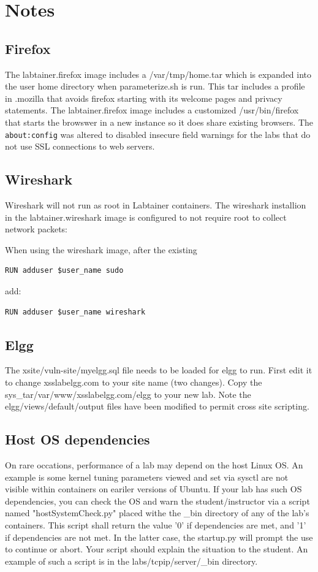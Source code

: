 \documentclass[12pt]{article}
\begin{document}
\section{Notes} \label{Notes}
\subsection{Firefox}
The labtainer.firefox image includes a /var/tmp/home.tar 
which is expanded into the user home directory when parameterize.sh is run.
This tar includes a profile in .mozilla that avoids firefox starting with its 
welcome pages and privacy statements.  The labtainer.firefox image includes a 
customized /usr/bin/firefox that starts the browswer in a new instance so it does share existing browsers. 
The {\tt about:config}
was altered to disabled insecure field warnings for the labs that do not use SSL connections to web servers.

\subsection{Wireshark}
Wireshark will not run as root in Labtainer containers.  
The wireshark installion in the labtainer.wireshark image is configured to not
require root to collect network packets:

When using the wireshark image, after the existing 
\begin{verbatim}
RUN adduser $user_name sudo
\end{verbatim}

\noindent add:

\begin{verbatim}
RUN adduser $user_name wireshark
\end{verbatim}

\subsection{Elgg}
The xsite/vuln-site/myelgg.sql file needs to be loaded for elgg to run.  First edit it to
change xsslabelgg.com to your site name (two changes).  Copy the sys\_tar/var/www/xsslabelgg.com/elgg
to your new lab.  Note the elgg/views/default/output files have been modified to permit cross site scripting.
\subsection{Host OS dependencies}
On rare occations, performance of a lab may depend on the host Linux OS.  An example is some
kernel tuning parameters viewed and set via sysctl are not visible within containers on eariler versions
of Ubuntu.  If your lab has such OS dependencies, you can check the OS and warn the student/instructor via a script
named "hostSystemCheck.py" placed withe the \_bin directory of any of the lab's containers.  This script shall
return the value '0' if dependencies are met, and '1' if dependencies are not met.  In the latter case, the 
startup.py will prompt the use to continue or abort.  Your script should explain the situation to the student.
An example of such a script is in the labs/tcpip/server/\_bin directory.
\end{document}

